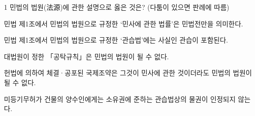 \begin{question}{1}
민법의 법원(法源)에 관한 설명으로 옳은 것은? (다툼이 있으면 판례에 따름)
\begin{choices}
  \item 민법 제1조에서 민법의 법원으로 규정한 ‘민사에 관한 법률’은 민법전만을 의미한다.
  \item 민법 제1조에서 민법의 법원으로 규정한 ‘관습법’에는 사실인 관습이 포함된다.
  \item 대법원이 정한 「공탁규칙」은 민법의 법원이 될 수 없다.
  \item 헌법에 의하여 체결·공포된 국제조약은 그것이 민사에 관한 것이더라도 민법의 법원이 될 수 없다.
  \item 미등기무허가 건물의 양수인에게는 소유권에 준하는 관습법상의 물권이 인정되지 않는다.
\end{choices}
\end{question}

